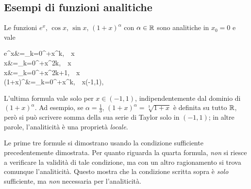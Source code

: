 \subsection{Esempi di funzioni analitiche}
\begin{theorema}\label{funzionianaliticheeserie}
	Le funzioni $e^x$, $\cos x$, $\sin x$, $\left(1+x\right)^\alpha$ con $\alpha\in\mathbb{R}$ sono analitiche in $x_0=0$ e vale
	\begin{flalign}
		e^x&=\sum_{k=0}^{+\infty}x^k,\ \ \forall x\in\realset\\
		\cos x&=\sum_{k=0}^{+\infty}x^{2k},\ \ \forall x\in\realset\\
		\sin x&=\sum_{k=0}^{+\infty}x^{2k+1},\ \ \forall x\in\realset\\
		\left(1+x\right)^\alpha&=\sum_{k=0}^{+\infty}x^k,\ \ \forall x\in\left(-1,1\right),\ \forall \alpha\in\realset
	\end{flalign}
\end{theorema}
\begin{attention}
	L'ultima formula vale solo per $x\in\left(-1,1\right)$, indipendentemente dal dominio di $\left(1+x\right)^\alpha$. Ad esempio, se $\alpha=\frac{1}{3}$, $\left(1+x\right)^\alpha=\sqrt[3]{1+x}$ è definita su tutto $\mathbb{R}$, però si può scrivere somma della sua serie di Taylor solo in $\left(-1,1\right)$; in altre parole, l'analiticità è una proprietà \textit{locale}.
\end{attention}
Le prime tre formule si dimostrano usando la condizione sufficiente precedentemente dimostrata. Per quanto riguarda la quarta formula, \textit{non} si riesce a verificare la validità di tale condizione, ma con un altro ragionamento si trova comunque l'analiticità. Questo mostra che la condizione scritta sopra è \textit{solo} sufficiente, ma \textit{non} necessaria per l'analiticità.
